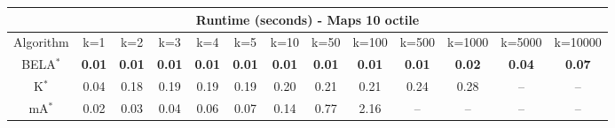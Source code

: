 \begin{tabular}{c|cccccccccccc}\toprule
\multicolumn{13}{c}{Runtime (seconds) - Maps 10 octile}\\ \midrule
Algorithm & k=1 & k=2 & k=3 & k=4 & k=5 & k=10 & k=50 & k=100 & k=500 & k=1000 & k=5000 & k=10000 \\ \midrule
BELA$^*$ & \textbf{0.01} & \textbf{0.01} & \textbf{0.01} & \textbf{0.01} & \textbf{0.01} & \textbf{0.01} & \textbf{0.01} & \textbf{0.01} & \textbf{0.01} & \textbf{0.02} & \textbf{0.04} & \textbf{0.07} \\
K$^*$ & 0.04 & 0.18 & 0.19 & 0.19 & 0.19 & 0.20 & 0.21 & 0.21 & 0.24 & 0.28 & -- & -- \\
mA$^*$ & 0.02 & 0.03 & 0.04 & 0.06 & 0.07 & 0.14 & 0.77 & 2.16 & -- & -- & -- & -- \\ \bottomrule 
\end{tabular}
